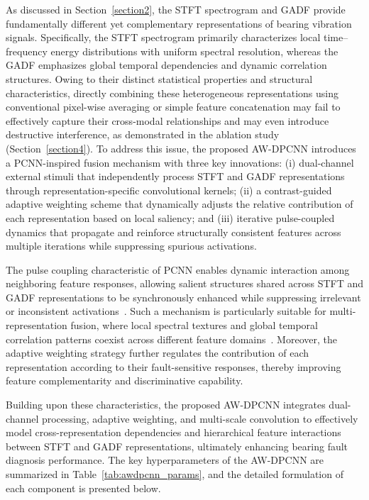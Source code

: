 \documentclass[journal]{IEEEtran}
\begin{document}
As discussed in Section~\ref{section2}, the STFT spectrogram and GADF provide fundamentally different yet complementary representations of bearing vibration signals. Specifically, the STFT spectrogram primarily characterizes local time--frequency energy distributions with uniform spectral resolution, whereas the GADF emphasizes global temporal dependencies and dynamic correlation structures. Owing to their distinct statistical properties and structural characteristics, directly combining these heterogeneous representations using conventional pixel-wise averaging or simple feature concatenation may fail to effectively capture their cross-modal relationships and may even introduce destructive interference, as demonstrated in the ablation study (Section~\ref{section4}). To address this issue, the proposed AW-DPCNN introduces a PCNN-inspired fusion mechanism with three key innovations: (i) dual-channel external stimuli that independently process STFT and GADF representations through representation-specific convolutional kernels; (ii) a contrast-guided adaptive weighting scheme that dynamically adjusts the relative contribution of each representation based on local saliency; and (iii) iterative pulse-coupled dynamics that propagate and reinforce structurally consistent features across multiple iterations while suppressing spurious activations.

The pulse coupling characteristic of PCNN enables dynamic interaction among neighboring feature responses, allowing salient structures shared across STFT and GADF representations to be synchronously enhanced while suppressing irrelevant or inconsistent activations~\cite{Li_2018}. Such a mechanism is particularly suitable for multi-representation fusion, where local spectral textures and global temporal correlation patterns coexist across different feature domains~\cite{kangEnhancementAlgorithmColor2021}. Moreover, the adaptive weighting strategy further regulates the contribution of each representation according to their fault-sensitive responses, thereby improving feature complementarity and discriminative capability.

Building upon these characteristics, the proposed AW-DPCNN integrates dual-channel processing, adaptive weighting, and multi-scale convolution to effectively model cross-representation dependencies and hierarchical feature interactions between STFT and GADF representations, ultimately enhancing bearing fault diagnosis performance. The key hyperparameters of the AW-DPCNN are summarized in Table~\ref{tab:awdpcnn_params}, and the detailed formulation of each component is presented below.
\end{document}
